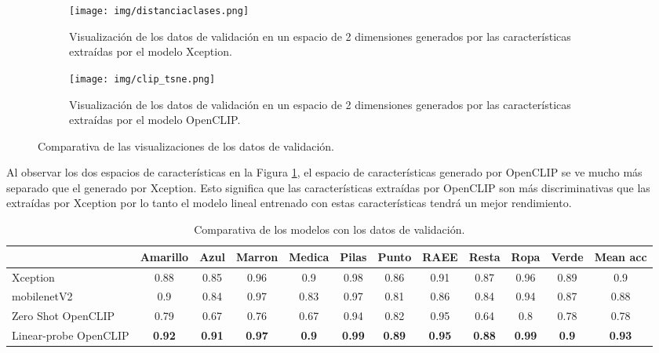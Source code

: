 \documentclass[10pt,a4paper,twocolumn,twoside]{article}
\begin{document}
\begin{figure}[h]
  \centering
  \begin{subfigure}[b]{0.45\textwidth}
    \centering
    \texttt{[image: img/distanciaclases.png]}
    \caption{Visualización de los datos de validación en un espacio de 2 dimensiones generados por
    las características extraídas por el modelo Xception.}
  \end{subfigure}
  \centering
  \begin{subfigure}[b]{0.45\textwidth}
    \centering
    \texttt{[image: img/clip\_tsne.png]}
    \caption{Visualización de los datos de validación en un espacio de 2 dimensiones generados por
    las características extraídas por el modelo OpenCLIP.}
  \end{subfigure}
  \caption{Comparativa de las visualizaciones de los datos de validación.}
  \label{fig:distanciaclases}
\end{figure}

Al observar los dos espacios de características en la Figura \ref{fig:distanciaclases}, el espacio
de características generado por OpenCLIP se ve mucho más separado que el generado por Xception. Esto
significa que las características extraídas por OpenCLIP son más discriminativas que las extraídas
por Xception por lo tanto el modelo lineal entrenado con estas características tendrá un mejor
rendimiento.

\begin{table*}[h]
  \centering
  \begin{tabular}{l|cccccccccc|c}
  \toprule
                        & Amarillo & Azul & Marron & Medica & Pilas & Punto & RAEE & Resta & Ropa & Verde & Mean acc     \\
  \midrule
  Xception              & 0.88     & 0.85 & 0.96   & 0.9    & 0.98  & 0.86  & 0.91 & 0.87 & 0.96 & 0.89  & 0.9            \\
  mobilenetV2           & 0.9      & 0.84 & 0.97   & 0.83   & 0.97  & 0.81  & 0.86 & 0.84 & 0.94 & 0.87  & 0.88           \\
  \midrule
  Zero Shot OpenCLIP    & 0.79     & 0.67 & 0.76   & 0.67   & 0.94  & 0.82  & 0.95 & 0.64 & 0.8  & 0.78  & 0.78           \\
  Linear-probe OpenCLIP & \textbf{0.92} & \textbf{0.91} & \textbf{0.97} & \textbf{0.9} & \textbf{0.99} & \textbf{0.89} & \textbf{0.95} & \textbf{0.88} & \textbf{0.99} & \textbf{0.9} & \textbf{0.93} \\
  \bottomrule
  \end{tabular}
  \caption{Comparativa de los modelos con los datos de validación.}
  \label{tab:my_label}
\end{table*}
\end{document}
